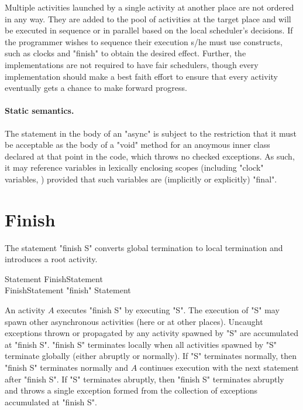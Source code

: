 Multiple activities launched by a single activity at another place are
not ordered in any way. They are added to the pool of activities at
the target place and will be executed in sequence or in parallel based
on the local scheduler's decisions. If the programmer wishes to
sequence their execution s/he must use \Xten{} constructs, such as
clocks and \xcd"finish" to obtain the desired effect.  Further, the
\Xten{} implementations are not required to have fair schedulers,
though every implementation should make a best faith effort to ensure
that every activity eventually gets a chance to make forward progress.

\paragraph{Static semantics.}
The statement in the body of an \xcd"async" is subject to the
restriction that it must be acceptable as the body of a \xcd"void"
method for an anoymous inner class declared at that point in the code,
which throws no checked exceptions. As such, it may reference
variables in lexically enclosing scopes (including \xcd"clock"
variables, ) provided that such variables are
(implicitly or explicitly) \xcd"final".

\section{Finish}\label{finish}
The statement \xcd"finish S" converts global termination to local
termination and introduces a root activity. 

\begin{grammar}
Statement \: FinishStatement \\
FinishStatement \: \xcd"finish" Statement \\
\end{grammar}

An activity $A$ executes \xcd"finish S" by executing \xcd"S".  The
execution of \xcd"S" may spawn other asynchronous activities (here or
at other places).  Uncaught exceptions thrown or propagated by any
activity spawned by \xcd"S" are accumulated at \xcd"finish S".
\xcd"finish S" terminates locally when all activities spawned by \xcd"S"
terminate globally (either abruptly or normally). If
\xcd"S" terminates normally, then \xcd"finish S" terminates normally
and $A$ continues execution with the next statement after \xcd"finish S".
If \xcd"S" terminates abruptly, then \xcd"finish S"
terminates abruptly and throws a single exception formed 
from the collection of exceptions accumulated at \xcd"finish S".

